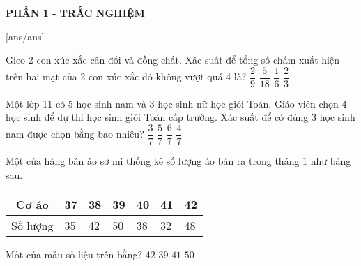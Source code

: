
\begin{center}
	\textbf{PHẦN 1 - TRẮC NGHIỆM}
\end{center}
[ans/ans]
\begin{ex}%
	Gieo 2 con xúc xắc cân đối và đồng chất. Xác suất để tổng số chấm xuất hiện trên hai mặt của 2 con xúc xắc đó không vượt quá 4 là?
	\choice
	{$\dfrac{2}{9}$}
	{$\dfrac{5}{18}$}
	{$\dfrac{1}{6}$}
	{$\dfrac{2}{3}$}
\end{ex}

\begin{ex}%
	Một lớp 11 có 5 học sinh nam và 3 học sinh nữ học giỏi Toán. Giáo viên chọn $ 4 $ học sinh để dự thi học sinh giỏi Toán cấp trường. Xác suất để có đúng $ 3 $ học sinh nam được chọn bằng bao nhiêu?
	\choice
	{\True $\dfrac{3}{7}$}
	{$\dfrac{5}{7}$}
	{$\dfrac{6}{7}$}
	{$\dfrac{4}{7}$}
\end{ex}

\begin{ex}%
	Một cửa hàng bán áo sơ mi thống kê số lượng áo bán ra trong tháng $ 1 $ như bảng sau.
	\begin{center}
		\begin{tabular}{|c|l|l|l|l|l|l|}
		\hline Cơ áo & 37 & 38 & 39 & 40 & 41 & 42 \\
		\hline Số lượng & 35 & 42 & 50 & 38 & 32 & 48 \\
		\hline
	\end{tabular}
	\end{center}
	Mốt của mẫu số liệu trên bằng? 
	\choice
	{$ 42  $}
	{$ 39  $}
	{$ 41  $}
	{\True $ 50 $}
\end{ex}

